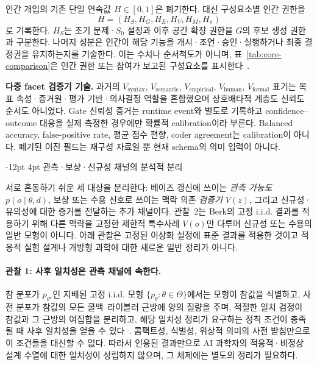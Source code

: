 \documentclass[11pt]{article}
\makeatletter
\renewcommand\subsection{\@startsection{subsection}{2}{\z@}%
  {-12pt \@plus -2pt \@minus -2pt}%
  {4pt \@plus 1pt}%
  {\normalfont\normalsize\bfseries}}
\makeatother
\begin{document}
인간 개입의 기존 단일 연속값 $H\in[0,1]$은 폐기한다. 대신 구성요소별 인간 권한을
\[
H=(H_S,H_G,H_E,H_V,H_M,H_\pi)
\]
로 기록한다. $H_S$는 초기 문제·$S_0$ 설정과 이후 공간 확장 권한을 $G$의 후보 생성 권한과 구분한다. 나머지 성분은 인간이 해당 기능을 개시·조언·승인·실행하거나 최종 결정권을 유지하는지를 기술한다. 이는 수치나 순서척도가 아니며, 표~\ref{tab:core-comparison}은 인간 권한 또는 참여가 보고된 구성요소를 표시한다~\citep{parasuraman2000automation}.

\noindent\textbf{다중 facet 검증기 기술.} 과거의 $V_\text{syntax}$, $V_\text{semantic}$, $V_\text{empirical}$, $V_\text{human}$, $V_\text{formal}$ 표기는 목표 속성·증거원·평가 기반·의사결정 역할을 혼합했으며 상호배타적 계층도 신뢰도 순서도 아니었다. Gate 신뢰성 증거는 runtime event와 별도로 기록하고 confidence--outcome 대응을 실제 측정한 경우에만 확률적 calibration이라 부른다. Balanced accuracy, false-positive rate, 평균 점수 편향, coder agreement는 calibration이 아니다. 폐기된 이진 필드는 재구성 자료일 뿐 현재 schema의 의미 입력이 아니다.

\subsection{관측·보상·신규성 채널의 분석적 분리}
\label{sec:vformal}

서로 혼동하기 쉬운 세 대상을 분리한다: 베이즈 갱신에 쓰이는 \emph{관측 가능도} $p(o\mid\theta,d)$, 보상 또는 수용 신호로 쓰이는 맥락 의존 \emph{검증기} $V(z)$, 그리고 신규성·유의성에 대한 증거를 전달하는 추가 채널이다. 관찰~2는 Berk의 고정 i.i.d. 결과를 적용하기 위해 다른 맥락을 고정한 제한적 특수사례 $V(o)$만 다루며 신규성 또는 수용의 일반 모형이 아니다. 아래 관찰은 고정된 이상화 설정에 표준 결과를 적용한 것이고 적응적 실험 설계나 개방형 과학에 대한 새로운 일반 정리가 아니다.

\paragraph{관찰 1: 사후 일치성은 관측 채널에 속한다.}
참 분포가 $p_{\theta^\star}$인 지배된 고정 i.i.d. 모형 $\{p_\theta:\theta\in\Theta\}$에서는 모형이 참값을 식별하고, 사전 분포가 참값의 모든 쿨백--라이블러 근방에 양의 질량을 주며, 적절한 일치 검정이 참값과 그 근방의 여집합을 분리하고, 해당 일치성 정리가 요구하는 정칙 조건이 충족될 때 사후 일치성을 얻을 수 있다~\citep{ghosal2017fundamentals}. 콤팩트성, 식별성, 위상적 의미의 사전 받침만으로 이 조건들을 대신할 수 없다. 따라서 인용된 결과만으로 AI 과학자의 적응적·비정상 설계 수열에 대한 일치성이 성립하지 않으며, 그 체제에는 별도의 정리가 필요하다.
\end{document}
